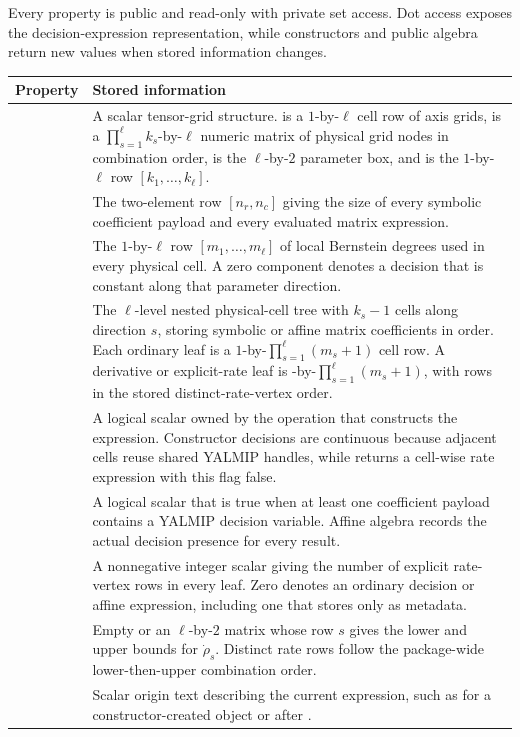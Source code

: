 Every  property is public and read-only with private set access. Dot access exposes the decision-expression representation, while constructors and public algebra return new values when stored information changes.

\begin{tabularx}{\textwidth}{@{}p{}Y@{}}
\toprule
Property & Stored information \\
\midrule
{} & A scalar tensor-grid structure.  is a $1$-by-$\ell$ cell row of axis grids,  is a $\prod_{s=1}^{\ell}k_s$-by-$\ell$ numeric matrix of physical grid nodes in combination order,  is the $\ell$-by-$2$ parameter box, and  is the $1$-by-$\ell$ row $[k_1,\ldots,k_\ell]$. \\
 & The two-element row $[n_r,n_c]$ giving the size of every symbolic coefficient payload and every evaluated matrix expression. \\
 & The $1$-by-$\ell$ row $[m_1,\ldots,m_\ell]$ of local Bernstein degrees used in every physical cell. A zero component denotes a decision that is constant along that parameter direction. \\
 & The $\ell$-level nested physical-cell tree with $k_s-1$ cells along direction $s$, storing symbolic or affine matrix coefficients in  order. Each ordinary leaf is a $1$-by-$\prod_{s=1}^{\ell}(m_s+1)$ cell row. A derivative or explicit-rate leaf is -by-$\prod_{s=1}^{\ell}(m_s+1)$, with rows in the stored distinct-rate-vertex order. \\
 & A logical scalar owned by the operation that constructs the expression. Constructor decisions are continuous because adjacent cells reuse shared YALMIP handles, while  returns a cell-wise rate expression with this flag false. \\
 & A logical scalar that is true when at least one coefficient payload contains a YALMIP decision variable. Affine algebra records the actual decision presence for every result. \\
 & A nonnegative integer scalar giving the number of explicit rate-vertex rows in every leaf. Zero denotes an ordinary decision or affine expression, including one that stores  only as metadata. \\
 & Empty or an $\ell$-by-$2$ matrix whose row $s$ gives the lower and upper bounds for $\dot{\rho}_s$. Distinct rate rows follow the package-wide lower-then-upper combination order. \\
 & Scalar origin text describing the current expression, such as  for a constructor-created object or  after . \\
\bottomrule
\end{tabularx}

